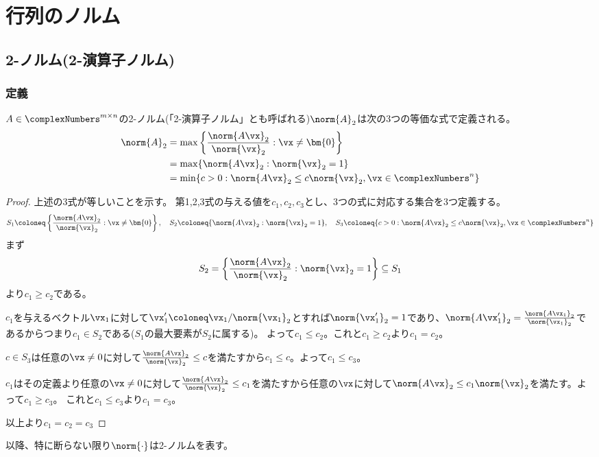 \chapter{行列のノルム}
    \section{2-ノルム(2-演算子ノルム)}
        \subsection{定義}
            \begin{shadebox}
                $A\in\complexNumbers^{m\times n}$の2-ノルム(「2-演算子ノルム」とも呼ばれる)$\norm{A}_2$は次の3つの等価な式で定義される。\\
                \begin{align*}
                    \norm{A}_2 &= \max\left\{\frac{\norm{A\vx}_2}{\norm{\vx}_2}:\vx\neq\bm{0}\right\}\\
                    &= \max\{\norm{A\vx}_2:\norm{\vx}_2=1\}\\
                    &= \min\{c>0:\norm{A\vx}_2\leq c\norm{\vx}_2,\vx\in\complexNumbers^n\}
                \end{align*}
            \end{shadebox}
            \begin{proof}
                \quad\par
                上述の3式が等しいことを示す。
                第1,2,3式の与える値を$c_1,c_2,c_3$とし、3つの式に対応する集合を3つ定義する。
                \[S_1 \coloneq \left\{\frac{\norm{A\vx}_2}{\norm{\vx}_2}:\vx\neq\bm{0}\right\},\quad S_2 \coloneq \{\norm{A\vx}_2:\norm{\vx}_2=1\},\quad S_3 \coloneq \{c>0:\norm{A\vx}_2\leq c\norm{\vx}_2,\vx\in\complexNumbers^n\}\]
                まず
                \[S_2 = \left\{\frac{\norm{A\vx}_2}{\norm{\vx}_2}:\norm{\vx}_2=1\right\}\subseteq S_1\]
                より$c_1\geq c_2$である。
                \par$c_1$を与えるベクトル$\vx_1$に対して$\vx_1' \coloneq \vx_1/\norm{\vx_1}_2$とすれば$\norm{\vx_1'}_2=1$であり、$\norm{A\vx_1'}_2=\frac{\norm{A\vx_1}_2}{\norm{\vx_1}_2}$であるからつまり$c_1\in S_2$である($S_1$の最大要素が$S_2$に属する)。
                よって$c_1\leq c_2$。これと$c_1\geq c_2$より$c_1=c_2$。
                \par
                $c\in S_3$は任意の$\vx\neq0$に対して$\frac{\norm{A\vx}_2}{\norm{\vx}_2}\leq c$を満たすから$c_1\leq c$。よって$c_1\leq c_3$。
                \par
                $c_1$はその定義より任意の$\vx\neq0$に対して$\frac{\norm{A\vx}_2}{\norm{\vx}_2}\leq c_1$を満たすから任意の$\vx$に対して$\norm{A\vx}_2\leq c_1\norm{\vx}_2$を満たす。よって$c_1\geq c_3$。
                これと$c_1\leq c_3$より$c_1=c_3$。
                \par
                以上より$c_1=c_2=c_3$
            \end{proof}
            以降、特に断らない限り$\norm{\cdot}$は2-ノルムを表す。
